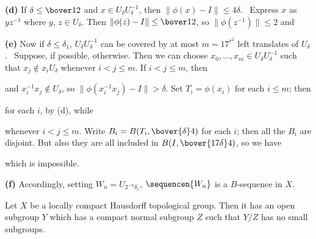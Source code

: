 {{\bf (d)} If $\delta\le\bover12$ and
$x\in U_{\delta}U_{\delta}^{-1}$, then $\|\phi(x)-I\|\le 4\delta$.
\Prf\ Express $x$ as $yz^{-1}$ where $y$,
$z\in U_{\delta}$.   Then $\|\phi(z)-I\|\le\bover12$, so
$\|\phi(z^{-1})\|\le 2$ and


\medskip

{\bf (e)} Now if $\delta\le\delta_1$,
$U_{\delta}U_{\delta}^{-1}$ can be covered by at most $m=17^{r^2}$ left
translates of $U_{\delta}$.   \Prf\Quer\ Suppose, if possible,
otherwise.   Then we can choose
$x_0,\ldots,x_m\in U_{\delta}U_{\delta}^{-1}$ such that
$x_j\notin x_iU_{\delta}$ whenever
$i<j\le m$.   If $i<j\le m$, then


\noindent and $x_i^{-1}x_j\notin U_{\delta}$, so
$\|\phi(x_i^{-1}x_j)-I\|>\delta$.
Set $T_i=\phi(x_i)$ for each $i\le m$;  then


\noindent for each $i$, by (d), while


\noindent whenever $i<j\le m$.   Write
$B_i=B(T_i,\bover{\delta}4)$ for each $i$;  then all the $B_i$ are
disjoint.   But also they are all included in $B(I,\bover{17\delta}4)$,
so we have


\noindent which is impossible.\ \Bang\Qed

\medskip

{\bf (f)} Accordingly, setting $W_n=U_{2^{-n}\delta_1}$,
$\sequencen{W_n}$ is a $B$-sequence in $X$.
}%


 Let $X$ be a locally compact Hausdorff
topological group.   Then it has an open subgroup $Y$ which has a
compact normal subgroup $Z$ such that $Y/Z$ has no small subgroups.

